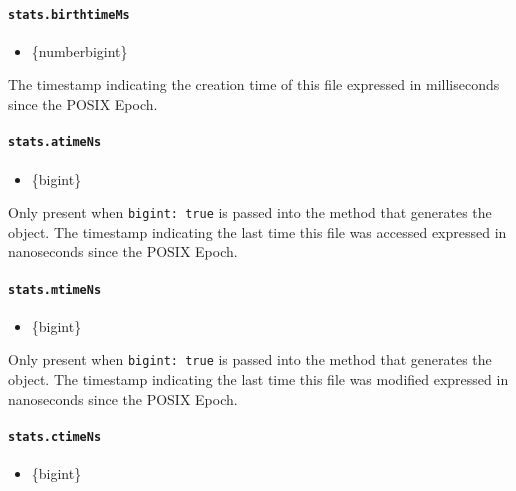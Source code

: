 \paragraph{\texorpdfstring{\texttt{stats.birthtimeMs}}{stats.birthtimeMs}}\label{stats.birthtimems}

\begin{itemize}
\tightlist
\item
  \{number\textbar bigint\}
\end{itemize}

The timestamp indicating the creation time of this file expressed in
milliseconds since the POSIX Epoch.

\paragraph{\texorpdfstring{\texttt{stats.atimeNs}}{stats.atimeNs}}\label{stats.atimens}

\begin{itemize}
\tightlist
\item
  \{bigint\}
\end{itemize}

Only present when \texttt{bigint:\ true} is passed into the method that
generates the object. The timestamp indicating the last time this file
was accessed expressed in nanoseconds since the POSIX Epoch.

\paragraph{\texorpdfstring{\texttt{stats.mtimeNs}}{stats.mtimeNs}}\label{stats.mtimens}

\begin{itemize}
\tightlist
\item
  \{bigint\}
\end{itemize}

Only present when \texttt{bigint:\ true} is passed into the method that
generates the object. The timestamp indicating the last time this file
was modified expressed in nanoseconds since the POSIX Epoch.

\paragraph{\texorpdfstring{\texttt{stats.ctimeNs}}{stats.ctimeNs}}\label{stats.ctimens}

\begin{itemize}
\tightlist
\item
  \{bigint\}
\end{itemize}

